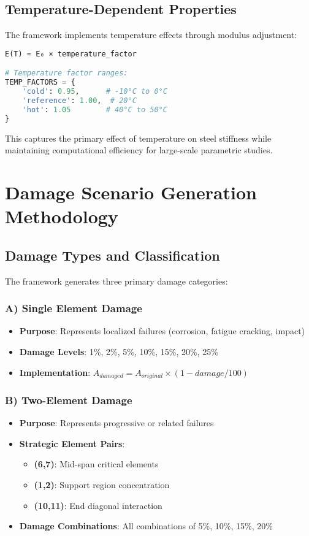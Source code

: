 \documentclass[12pt,a4paper]{article}
\begin{document}
\subsection{Temperature-Dependent Properties}

The framework implements temperature effects through modulus adjustment:

\begin{lstlisting}[language=Python, caption=Temperature Effects Implementation]
E(T) = E₀ × temperature_factor

# Temperature factor ranges:
TEMP_FACTORS = {
    'cold': 0.95,      # -10°C to 0°C
    'reference': 1.00,  # 20°C
    'hot': 1.05        # 40°C to 50°C
}
\end{lstlisting}

This captures the primary effect of temperature on steel stiffness while maintaining computational efficiency for large-scale parametric studies.

\section{Damage Scenario Generation Methodology}

\subsection{Damage Types and Classification}

The framework generates three primary damage categories:

\subsubsection{A) Single Element Damage}
\begin{itemize}
    \item \textbf{Purpose}: Represents localized failures (corrosion, fatigue cracking, impact)
    \item \textbf{Damage Levels}: 1\%, 2\%, 5\%, 10\%, 15\%, 20\%, 25\%
    \item \textbf{Implementation}: $A_{damaged} = A_{original} \times (1 - damage/100)$
\end{itemize}

\subsubsection{B) Two-Element Damage}
\begin{itemize}
    \item \textbf{Purpose}: Represents progressive or related failures
    \item \textbf{Strategic Element Pairs}:
    \begin{itemize}
        \item \textbf{(6,7)}: Mid-span critical elements
        \item \textbf{(1,2)}: Support region concentration
        \item \textbf{(10,11)}: End diagonal interaction
    \end{itemize}
    \item \textbf{Damage Combinations}: All combinations of 5\%, 10\%, 15\%, 20\%
\end{itemize}
\end{document}
